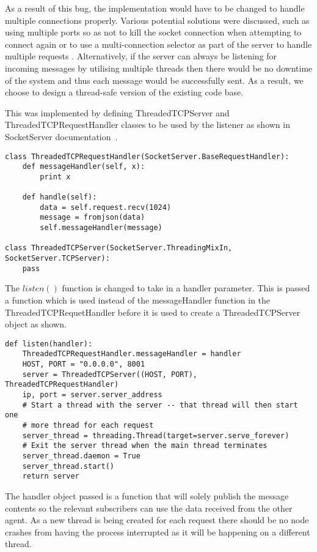 As a result of this bug, the implementation would have to be changed to handle
multiple connections properly. Various potential solutions were discussed,
such as using multiple ports so as not to kill the socket connection when
attempting to connect again or to use a multi-connection selector as part of
the server to handle multiple requests \cite{multiconnectionServer}.
Alternatively, if the server can always be listening for incoming messages by
utilising multiple threads then there would be no downtime of the system and
thus each message would be successfully sent. As a result, we choose to
design a thread-safe version of the existing code base.

This was implemented by defining ThreadedTCPServer and ThreadedTCPRequestHandler
classes to be used by the listener as shown in SocketServer documentation~\cite{socketServerDocs}.
\begin{lstlisting}
class ThreadedTCPRequestHandler(SocketServer.BaseRequestHandler):
    def messageHandler(self, x):
        print x

    def handle(self):
        data = self.request.recv(1024)
        message = fromjson(data)
        self.messageHandler(message)

class ThreadedTCPServer(SocketServer.ThreadingMixIn, SocketServer.TCPServer):
    pass
\end{lstlisting}
The $listen()$ function is changed to take in a handler parameter. This is
passed a function which is used instead of the messageHandler function in
the ThreadedTCPRequetHandler before it is used to create a ThreadedTCPServer
object as shown.
\begin{lstlisting}
def listen(handler):
    ThreadedTCPRequestHandler.messageHandler = handler
    HOST, PORT = "0.0.0.0", 8001
    server = ThreadedTCPServer((HOST, PORT), ThreadedTCPRequestHandler)
    ip, port = server.server_address
    # Start a thread with the server -- that thread will then start one
    # more thread for each request
    server_thread = threading.Thread(target=server.serve_forever)
    # Exit the server thread when the main thread terminates
    server_thread.daemon = True
    server_thread.start()
    return server
\end{lstlisting}
The handler object passed is a function that will solely publish the
message contents so the relevant subscribers can use the data received
from the other agent. As a new thread is being created for each request
there should be no node crashes from having the process interrupted as
it will be happening on a different thread.

